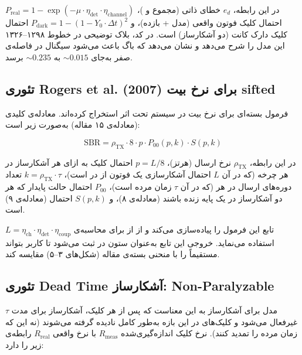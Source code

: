 در این رابطه، $e_d$ خطای ذاتی (مجموع  و )، $P_{\text{real}} = 1 - \exp(-\mu \cdot \eta_{\text{det}} \cdot \eta_{\text{channel}})$ احتمال کلیک فوتون واقعی (مدل  + بازده)، و $P_{\text{dark}} = 1 - (1 - Y_0 \cdot \Delta t)^2$ احتمال کلیک دارک کانت (دو آشکارساز) است. در کد، بلاک توضیحی در خطوط ۱۲۹۸–۱۳۲۶ این مدل را شرح می‌دهد و نشان می‌دهد که باگ  باعث می‌شود  سیگنال در فاصله‌ی صفر به‌جای $\sim 0.015$ به $\sim 0.235$ برسد.

\subsection{تئوری Rogers et al. (2007) برای نرخ بیت sifted}

 فرمول بسته‌ای برای نرخ بیت  در سیستم  تحت اثر  استخراج کرده‌اند. معادله‌ی کلیدی (معادله‌ی ۱۵ مقاله) به‌صورت زیر است:

\begin{equation}
	\text{SBR} = \rho_{\text{TX}} \cdot 8 \cdot p \cdot P_{00}(p, k) \cdot S(p, k)
\end{equation}

در این رابطه، $\rho_{\text{TX}}$ نرخ ارسال (هرتز)، $p = L/8$ احتمال کلیک به ازای هر آشکارساز در هر چرخه (که در آن $L$ احتمال آشکارسازی یک فوتون از  در  است)، $k = \rho_{\text{TX}} \cdot \tau$ تعداد دوره‌های ارسال در هر  (که در آن $\tau$ زمان مرده است)، $P_{00}$ احتمال حالت پایدار که هر دو آشکارساز در یک پایه زنده باشند (معادله‌ی ۸)، و $S(p, k)$ احتمال  (معادله‌ی ۹) است.

تابع  این فرمول را پیاده‌سازی می‌کند و از  از  برای محاسبه‌ی $L = \eta_{\text{ch}} \cdot \eta_{\text{det}} \cdot \eta_{\text{coup}}$ استفاده می‌نماید. خروجی این تابع به‌عنوان ستون  در  ثبت می‌شود تا کاربر بتواند مستقیماً  را با منحنی بسته‌ی مقاله (شکل‌های ۳–۵) مقایسه کند.

\subsection{تئوری Dead Time آشکارساز: Non-Paralyzable}

مدل  برای  آشکارساز  به این معناست که پس از هر کلیک، آشکارساز برای مدت $\tau$ غیرفعال می‌شود و کلیک‌های در این بازه به‌طور کامل نادیده گرفته می‌شوند (نه این که زمان مرده را تمدید کنند). نرخ کلیک اندازه‌گیری‌شده $R_{\text{meas}}$ با نرخ واقعی $R_{\text{real}}$ رابطه‌ی زیر را دارد:

